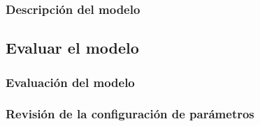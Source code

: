     \subsubsection{Descripción del modelo}
\subsection{Evaluar el modelo}
    \subsubsection{Evaluación del modelo}
    \subsubsection{Revisión de la configuración de parámetros}

